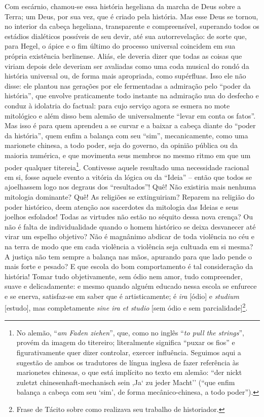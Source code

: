 Com escárnio, chamou-se essa história hegeliana da marcha de Deus sobre
a Terra; um Deus, por sua vez, que é criado pela história. Mas esse Deus
se tornou, no interior da cabeça hegeliana, transparente e
compreensível, superando todos os estádios dialéticos possíveis de seu
devir, até sua autorrevelação: de sorte que, para Hegel, o ápice e o fim
último do processo universal coincidem em sua própria existência
berlinense. Aliás, ele deveria dizer que todas as coisas que viriam
depois dele deveriam ser avaliadas como uma coda musical do rondó da
história universal ou, de forma mais apropriada, como supérfluas. Isso
ele não disse: ele plantou nas gerações por ele fermentadas a admiração
pelo ``poder da história'', que envolve praticamente todo instante na
admiração nua do desfecho e conduz à idolatria do factual: para cujo
serviço agora se esmera no mote mitológico e além disso bem alemão de
universalmente ``levar em conta os fatos''. Mas isso é para quem
aprendeu a se curvar e a baixar a cabeça diante do ``poder da
história'', quem enfim a balança com seu ``sim'', mecanicamente, como
uma marionete chinesa, a todo poder, seja do governo, da opinião pública
ou da maioria numérica, e que movimenta seus membros no mesmo ritmo em
que um poder qualquer titereia\footnote{No alemão, ``\emph{am Faden
  ziehen}'', que, como no inglês ``\emph{to pull the strings}'', provém
  da imagem do titereiro; literalmente significa ``puxar os fios'' e
  figurativamente quer dizer controlar, exercer influência. Seguimos
  aqui a sugestão de ambos os tradutores de língua inglesa de fazer
  referência às marionetes chinesas, o que está implícito no texto em
  alemão: ``der nickt zuletzt chinesenhaft-mechanisch sein ‚Ja` zu jeder
  Macht'' (``que enfim balança a cabeça com seu `sim', de forma
  mecânico-chinesa, a todo poder'').}. Contivesse aquele resultado uma
necessidade racional em si, fosse aquele evento a vitória da lógica ou
da ``Ideia'' -- então que todos se ajoelhassem logo nos degraus dos
``resultados''! Quê! Não existiria mais nenhuma mitologia dominante?
Quê! As religiões se extinguiriam? Reparem na religião do poder
histórico, deem atenção aos sacerdotes da mitologia das Ideias e seus
joelhos esfolados! Todas as virtudes não estão no séquito dessa nova
crença? Ou não é falta de individualidade quando o homem histórico se
deixa desvanecer até virar um espelho objetivo? Não é magnânimo abdicar
de toda violência no céu e na terra de modo que em cada violência a
violência seja cultuada em si mesma? A justiça não tem sempre a balança
nas mãos, apurando para que lado pende o mais forte e pesado? E que
escola do bom comportamento é tal consideração da história! Tomar tudo
objetivamente, sem ódio nem amor, tudo compreender, suave e
delicadamente: e mesmo quando alguém educado nessa escola se enfurece e
se enerva, satisfaz-se em saber que é artisticamente; é \emph{ira}
{[}ódio{]} e \emph{studium} {[}estudo{]}, mas completamente \emph{sine
ira et studio} {[}sem ódio e sem parcialidade{]}\footnote{Frase de
  Tácito sobre como realizava seu trabalho de historiador.}.

